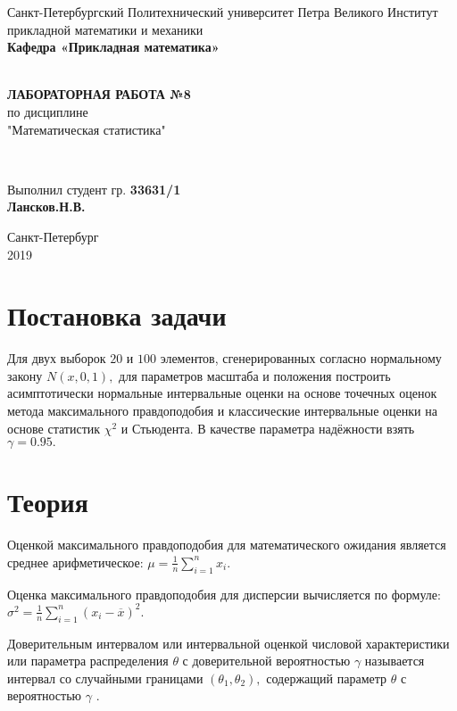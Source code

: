 \documentclass[12pt]{article}
\renewcommand{\listoffigures}{\begingroup  %
\tocsection
\tocfile{\listfigurename}{lof}
\endgroup}
\renewcommand{\listoftables}{\begingroup  %
\tocsection
\tocfile{\listtablename}{lot}
\endgroup}
\begin{document}
\begin{titlepage}
	\center
		Санкт-Петербургский Политехнический 
		университет Петра Великого
		Институт прикладной математики и механики
		\\ \textbf{Кафедра «Прикладная математика»}

	\vfill ~
	\textbf{
		\\ \large ЛАБОРАТОРНАЯ РАБОТА №8
	}
	\\	по дисциплине 
	\\	"Математическая статистика"

	\vfill ~

	Выполнил студент гр. \textbf{33631/1} \\
	\textbf{Лансков.Н.В.} \\ 

\vfill

{\large}	Санкт-Петербург
\\ 2019
\end{titlepage}


\tableofcontents 
\newpage
\listoftables
\newpage

\section{Постановка задачи}

Для двух выборок $20$ и $100$ элементов, сгенерированных согласно нормальному закону $N(x,0,1),$ для параметров масштаба и положения построить асимптотически нормальные интервальные оценки на основе точечных оценок метода максимального правдоподобия и классические интервальные оценки на основе статистик $\chi^2$ и Стьюдента. В качестве параметра надёжности взять $\gamma = 0.95.$


\section{Теория}

Оценкой максимального правдоподобия для математического ожидания  является среднее арифметическое: $\mu=\frac{1}{n}\sum\limits_{i=1}^nx_i.$

Оценка максимального правдоподобия для дисперсии вычисляется по формуле: $\sigma^2 = \frac{1}{n}\sum\limits_{i=1}^n(x_i-\overline{x})^2.$

Доверительным интервалом или интервальной оценкой числовой характеристики или параметра распределения $\theta$ с доверительной вероятностью $\gamma$ называется интервал со случайными границами $(\theta_1,\theta_2),$ содержащий параметр $\theta$ с вероятностью $\gamma$ \cite{8_1}.
\end{document}
